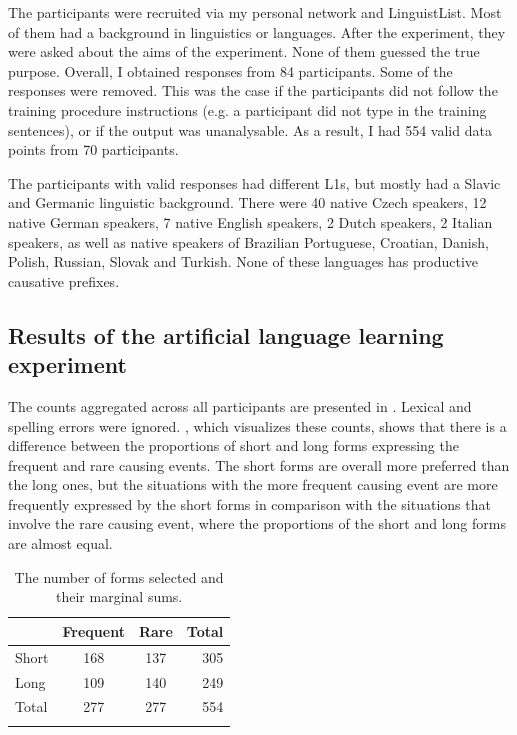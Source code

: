 \documentclass[output=paper]{langsci/langscibook}
\begin{document}
The participants were recruited via my personal network and LinguistList. Most of them had a background in linguistics or languages. After the experiment, they were asked about the aims of the experiment. None of them guessed the true purpose. Overall, I obtained responses from 84 participants. Some of the responses were removed. This was the case if the participants did not follow the training procedure instructions (e.g. a participant did not type in the training sentences), or if the output was unanalysable. As a result, I had 554 valid data points from 70 participants. 

The participants with valid responses had different L1s, but mostly had a Slavic and Germanic linguistic background. There were 40 native Czech speakers, 12 native German speakers, 7 native English speakers, 2 Dutch speakers, 2 Italian speakers, as well as native speakers of Brazilian Portuguese, Croatian, Danish, Polish, Russian, Slovak and Turkish. None of these languages has productive causative prefixes.

\subsection{Results of the artificial language learning experiment}

The counts aggregated across all participants are presented in . Lexical and spelling errors were ignored. , which visualizes these counts, shows that there is a difference between the proportions of short and long forms expressing the frequent and rare causing events. The short forms are overall more preferred than the long ones, but the situations with the more frequent causing event are more frequently expressed by the short forms in comparison with the situations that involve the rare causing event, where the proportions of the short and long forms are almost equal.

\begin{table}
\begin{tabularx}{.8\textwidth}{XSS@{\qquad\qquad}r} 
\lsptoprule
& Frequent & Rare &  {Total}\\
\midrule
Short & 168 & 137 &  {305}\\
Long & 109 & 140 &  {249}\\
\midrule 
 {Total} &  {277} &  {277} &  {554}\\
\lspbottomrule
\end{tabularx} 
\caption{The number of forms selected and their marginal sums.}
\label{tab:1}
\end{table}
\end{document}
